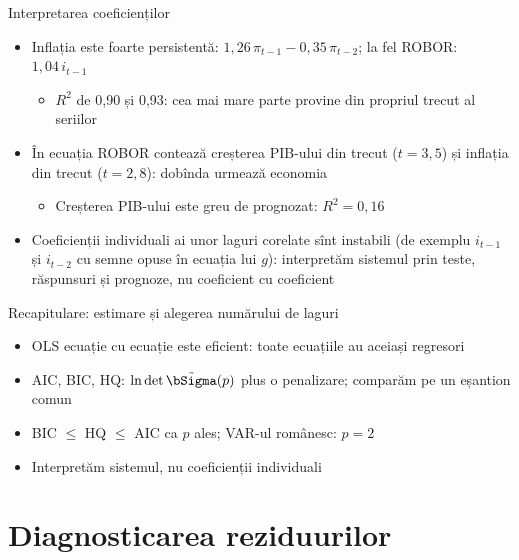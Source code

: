 \begin{frame}{Interpretarea coeficienților}
\itemsize{\small}
\begin{itemize}
    \item Inflația este foarte persistentă: $1{,}26\,\pi_{t-1} -0{,}35\,\pi_{t-2}$; la fel ROBOR: $1{,}04\,i_{t-1}$
    \begin{itemize}
        \item $R^2$ de 0{,}90 și 0{,}93: cea mai mare parte provine din propriul trecut al seriilor
    \end{itemize}
    \item În ecuația ROBOR contează creșterea PIB-ului din trecut ($t = 3{,}5$) și inflația din trecut ($t = 2{,}8$): dobînda urmează economia
    \begin{itemize}
        \item Creșterea PIB-ului este greu de prognozat: $R^2 = 0{,}16$
    \end{itemize}
    \item Coeficienții individuali ai unor laguri corelate sînt instabili (de exemplu $i_{t-1}$ și $i_{t-2}$ cu semne opuse în ecuația lui $g$): interpretăm sistemul prin teste, răspunsuri și prognoze, nu coeficient cu coeficient
\end{itemize}
\end{frame}

\begin{frame}{Recapitulare: estimare și alegerea numărului de laguri}
\itemsize{\small}
\begin{itemize}
    \item OLS ecuație cu ecuație este eficient: toate ecuațiile au aceiași regresori
    \item AIC, BIC, HQ: $\ln\det\tilde\bSigma(p)$ plus o penalizare; comparăm pe un eșantion comun
    \item BIC $\le$ HQ $\le$ AIC ca $p$ ales; VAR-ul românesc: $p = 2$
    \item Interpretăm sistemul, nu coeficienții individuali
\end{itemize}
\end{frame}


\section{Diagnosticarea reziduurilor}

